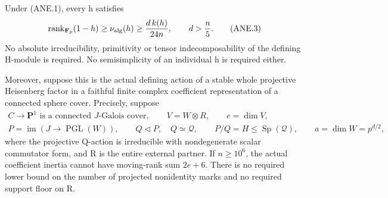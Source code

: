 \begin{theorem}[D-TD37]
Under (ANE.1), every h satisfies
\[
 \operatorname{rank}_{\mathbf F_p}(1-h)
       \ge\nu_{\rm alg}(h)\ge\frac{d\,k(h)}{24n},
       \qquad d>\frac n5.
 \tag{ANE.3}
\]
No absolute irreducibility, primitivity or tensor indecomposability
of the defining H-module is required.  No semisimplicity of an
individual h is required either.

Moreover, suppose this is the actual defining action of a stable
whole projective Heisenberg factor in a faithful finite complex
coefficient representation of a connected sphere cover.  Precisely,
suppose
\[
 \begin{gathered}
 C\longrightarrow\mathbf P^1\text{ is a connected }J\text{-Galois cover},
 \qquad V=W\otimes R,\qquad e=\dim V,\\
 P=\operatorname{im}(J\to\operatorname{PGL}(W)),\qquad
 Q\triangleleft P,\quad Q\simeq\mathcal Q,\qquad
 P/Q=H\le\operatorname{Sp}(\mathcal Q),\qquad
 a=\dim W=p^{d/2},
 \end{gathered}
 \tag{ANE.4}
\]
where the projective Q-action is irreducible with nondegenerate
scalar commutator form, and R is the entire external partner.
If \(n\ge10^6\), the actual coefficient inertia cannot have
moving-rank sum \(2e+6\).  There is no required lower bound on
the number of projected nonidentity marks and no required support
floor on R.
\end{theorem}

